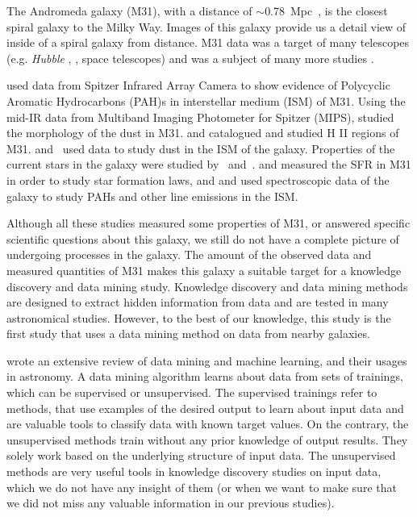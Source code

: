 The Andromeda galaxy (M31), with a distance of $\sim$0.78~Mpc~\citep{McConnachie05}, is the closest spiral galaxy to the Milky Way.
Images of this galaxy provide us a detail view of inside of a spiral galaxy from distance.
M31 data was a target of many telescopes (e.g. {\it Hubble} \citep{Dalcanton12}, \Spitzer\citep{Wener04}, \Herschel\citep{Pilbratt10} space telescopes) and was a subject of many more studies \citep[e.g.][and references therein]{Barmby06, Gordon06, Azimlu11, Sanders12, Dim15, Rahmani16}. 

\cite{Barmby06} used data from Spitzer Infrared Array Camera \citep[IRAC;][]{Fazio04} to show evidence of Polycyclic Aromatic Hydrocarbons (PAH)s in interstellar medium (ISM) of M31.
Using the mid-IR data from Multiband Imaging Photometer for Spitzer (MIPS), \cite{Gordon06} studied the morphology of the dust in M31.
\cite{Azimlu11} and \cite{Sanders12} catalogued and studied H {\sc II} regions of M31.
\cite{Draine14, Mattsson14, Viaene14, Smith12} and~\cite{Fritz12} used \Herschel data to study dust in the ISM of the galaxy.
Properties of the current stars in the galaxy were studied by~\cite{Tamm12} and~\cite{Massey07}. %
\cite{Rahmani16, Ford13} and \cite{Tabatabaei10} measured the SFR in M31 in order to study star formation laws, and \cite{Dim15} and \cite{Kapala15} used spectroscopic data of the galaxy to study PAHs and other line emissions in the ISM.

Although all these studies measured some properties of M31, or answered specific scientific questions about this galaxy, we still do not have a complete picture of undergoing processes in the galaxy.
The amount of the observed data and measured quantities of M31 makes this galaxy a suitable target for a knowledge discovery and data mining study.
Knowledge discovery and data mining methods are designed to extract hidden information from data and are tested in many astronomical studies.
However, to the best of our knowledge, this study is the first study that uses a data mining method on data from nearby galaxies. %

\cite{Ball10} wrote an extensive review of data mining and machine learning, and their usages in astronomy.
A data mining algorithm learns about data from sets of trainings, which can be supervised or unsupervised.
The supervised trainings refer to methods, that use examples of the desired output to learn about input data and are valuable tools to classify data with known target values.
On the contrary, the unsupervised methods train without any prior knowledge of output results. 
They solely work based on the underlying structure of input data.   
The unsupervised methods are very useful tools in knowledge discovery studies on input data, which we do not have any insight of them (or when we want to make sure that we did not miss any valuable information in our previous studies). %


